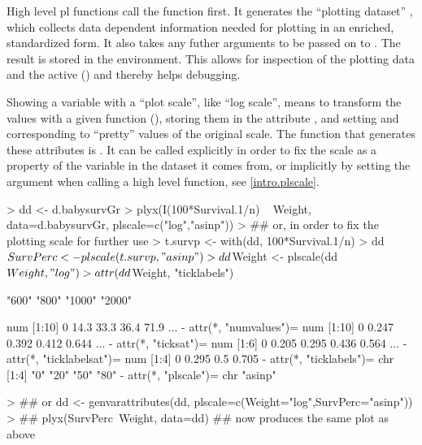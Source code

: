 \documentclass[11pt]{article}
\begin{document}
High level pl functions call the function  first.
It generates the ``plotting dataset'' , which
collects data dependent information needed for plotting in an enriched,
standardized form. 
It also takes any futher arguments to be passed on to .
The result is stored in the  environment.
This allows for inspection of the plotting data
 and the active  ()
and thereby helps debugging.

Showing a variable with a ``plot scale'', like ``log scale'', means
to transform the values with a given function (), storing them
in the attribute , and setting 
 and  corresponding to ``pretty''
values of the original scale.
The function that generates these attributes is .
It can be called explicitly in order to fix the scale as a property
of the variable in the dataset it comes from, or implicitly by 
setting the argument  when calling a high level function,
see \ref{intro.plscale}.
\begin{Schunk}
\begin{Sinput}
>   dd <- d.babysurvGr
>   plyx(I(100*Survival.1/n) ~ Weight, data=d.babysurvGr, plscale=c("log","asinp"))
>   ## or, in order to fix the plotting scale for further use
>   t.survp <- with(dd, 100*Survival.1/n)
>   dd$SurvPerc <- plscale(t.survp, "asinp")
>   dd$Weight <- plscale(dd$Weight, "log")
>   attr(dd$Weight, "ticklabels")
\end{Sinput}
\begin{Soutput}
[1] "600"  "800"  "1000" "2000"
\end{Soutput}
\begin{Soutput}
 num [1:10] 0 14.3 33.3 36.4 71.9 ...
 - attr(*, "numvalues")= num [1:10] 0 0.247 0.392 0.412 0.644 ...
 - attr(*, "ticksat")= num [1:6] 0 0.205 0.295 0.436 0.564 ...
 - attr(*, "ticklabelsat")= num [1:4] 0 0.295 0.5 0.705
 - attr(*, "ticklabels")= chr [1:4] "0" "20" "50" "80"
 - attr(*, "plscale")= chr "asinp"
\end{Soutput}
\begin{Sinput}
>   ## or  dd <- genvarattributes(dd, plscale=c(Weight="log",SurvPerc="asinp"))
>   ## plyx(SurvPerc~Weight, data=dd) ## now produces the same plot as above
\end{Sinput}
\end{Schunk}
\end{document}

